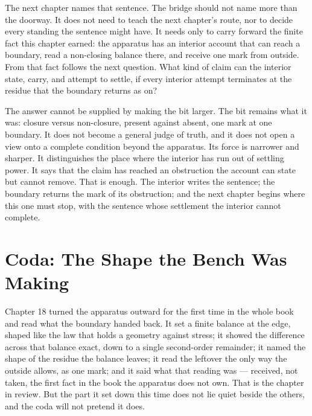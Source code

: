 The next chapter names that sentence. The bridge should not name more than the doorway. It does
not need to teach the next chapter's route, nor to decide every standing the sentence might have.
It needs only to carry forward the finite fact this chapter earned: the apparatus has an
interior account that can reach a boundary, read a non-closing balance there, and receive one
mark from outside. From that fact follows the next question. What kind of claim can the interior
state, carry, and attempt to settle, if every interior attempt terminates at the residue that
the boundary returns as on?

The answer cannot be supplied by making the bit larger. The bit remains what it was: closure
versus non-closure, present against absent, one mark at one boundary. It does not become a
general judge of truth, and it does not open a view onto a complete condition beyond the
apparatus. Its force is narrower and sharper. It distinguishes the place where the interior has
run out of settling power. It says that the claim has reached an obstruction the account can
state but cannot remove. That is enough. The interior writes the sentence; the boundary returns
the mark of its obstruction; and the next chapter begins where this one must stop, with the
sentence whose settlement the interior cannot complete.

\section*{Coda: The Shape the Bench Was Making}

Chapter 18 turned the apparatus outward for the first time in the whole book and read what the boundary handed back. It set a finite balance at the edge, shaped like the law that holds a geometry against stress; it showed the difference across that balance exact, down to a single second-order remainder; it named the shape of the residue the balance leaves; it read the leftover the only way the outside allows, as one mark; and it said what that reading was --- received, not taken, the first fact in the book the apparatus does not own. That is the chapter in review. But the part it set down this time does not lie quiet beside the others, and the coda will not pretend it does.

